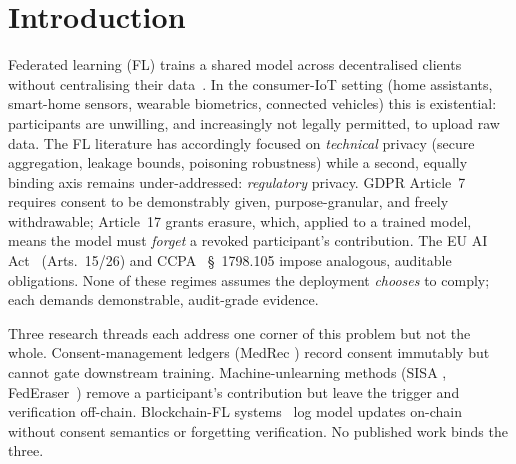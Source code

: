\section{Introduction}
\label{sec:introduction}

Federated learning (FL) trains a shared model across decentralised
clients without centralising their data~\cite{mcmahan2017fedavg}. In
the consumer-IoT setting (home assistants, smart-home sensors,
wearable biometrics, connected vehicles) this is existential:
participants are unwilling, and increasingly not legally permitted,
to upload raw data. The FL literature has accordingly focused on
\emph{technical} privacy (secure aggregation, leakage bounds,
poisoning robustness) while a second, equally binding axis remains
under-addressed: \emph{regulatory} privacy. GDPR Article~7 requires
consent to be demonstrably given, purpose-granular, and freely
withdrawable; Article~17 grants erasure, which, applied to a
trained model, means the model must \emph{forget} a revoked
participant's contribution. The EU AI Act~\cite{aiact2024}
(Arts.~15/26) and CCPA~\cite{ccpa2018} \S~1798.105 impose analogous,
auditable obligations. None of these regimes assumes the deployment
\emph{chooses} to comply; each demands demonstrable, audit-grade
evidence.

Three research threads each address one corner of this problem but
not the whole. Consent-management ledgers (MedRec
\cite{azaria2016medrec}) record consent immutably but cannot gate
downstream training. Machine-unlearning methods (SISA
\cite{bourtoule2021sisa}, FedEraser~\cite{liu2021federaser}) remove a
participant's contribution but leave the trigger and verification
off-chain. Blockchain-FL systems~\cite{kim2020blockchained,li2020bflc}
log model updates on-chain without consent semantics or
forgetting verification. No published work binds the three.

